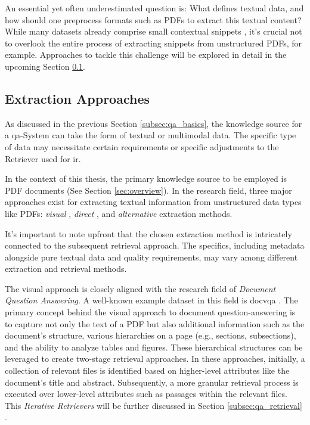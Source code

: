 An essential yet often underestimated question is: What defines textual data, and how should one preprocess formats such as PDFs to extract this textual content? While many datasets already comprise small contextual snippets \cite{wang_modern_2022}, it's crucial not to overlook the entire process of extracting snippets from unstructured PDFs, for example. Approaches to tackle this challenge will be explored in detail in the upcoming Section \ref{subsec:qa_indexing}.


\subsection{Extraction Approaches}
\label{subsec:qa_indexing}

As discussed in the previous Section \ref{subsec:qa_basics}, the knowledge source for a \gls{qa}-System can take the form of textual or multimodal data. The specific type of data may necessitate certain requirements or specific adjustments to the Retriever used for \gls{ir}.

In the context of this thesis, the primary knowledge source to be employed is PDF documents (See Section \ref{sec:overview}). In the research field, three major approaches exist for extracting textual information from unstructured data types like PDFs: \textit{visual} \cite{tito_document_2021}, \textit{direct} \cite{wang_multi-passage_2019}, and \textit{alternative} \cite{dasigi_dataset_2021} extraction methods.

It's important to note upfront that the chosen extraction method is intricately connected to the subsequent retrieval approach. The specifics, including metadata alongside pure textual data and quality requirements, may vary among different extraction and retrieval methods.

The visual approach is closely aligned with the research field of \textit{Document Question Answering}. A well-known example dataset in this field is \gls{docvqa} \cite{tito_document_2021}. The primary concept behind the visual approach to document question-answering is to capture not only the text of a PDF but also additional information such as the document's structure, various hierarchies on a page (e.g., sections, subsections), and the ability to analyze tables and figures. These hierarchical structures can be leveraged to create two-stage retrieval approaches. In these approaches, initially, a collection of relevant files is identified based on higher-level attributes like the document's title and abstract. Subsequently, a more granular retrieval process is executed over lower-level attributes such as passages within the relevant files. This \textit{Iterative Retrievers} will be further discussed in Section \ref{subsec:qa_retrieval} \cite{liu_dense_2021}.

